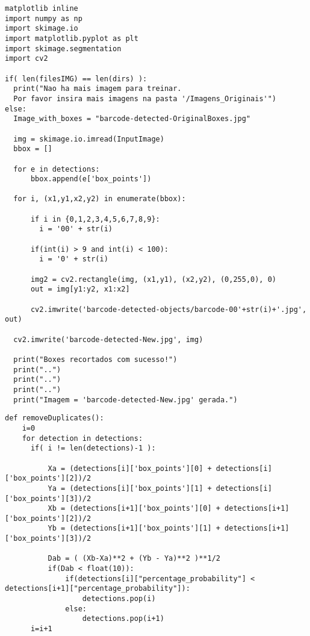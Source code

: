 \begin{lstlisting}[caption=Recorte das \textit{bounding box} e exportação para uma pasta tags-images]
matplotlib inline
import numpy as np
import skimage.io
import matplotlib.pyplot as plt
import skimage.segmentation
import cv2

if( len(filesIMG) == len(dirs) ):
  print("Nao ha mais imagem para treinar. 
  Por favor insira mais imagens na pasta '/Imagens_Originais'")
else:
  Image_with_boxes = "barcode-detected-OriginalBoxes.jpg"

  img = skimage.io.imread(InputImage)
  bbox = []

  for e in detections:
      bbox.append(e['box_points'])

  for i, (x1,y1,x2,y2) in enumerate(bbox):

      if i in {0,1,2,3,4,5,6,7,8,9}:
        i = '00' + str(i)
      
      if(int(i) > 9 and int(i) < 100):
        i = '0' + str(i)

      img2 = cv2.rectangle(img, (x1,y1), (x2,y2), (0,255,0), 0)
      out = img[y1:y2, x1:x2]

      cv2.imwrite('barcode-detected-objects/barcode-00'+str(i)+'.jpg', out)

  cv2.imwrite('barcode-detected-New.jpg', img)

  print("Boxes recortados com sucesso!")
  print("..")
  print("..")
  print("..")
  print("Imagem = 'barcode-detected-New.jpg' gerada.")
\end{lstlisting}

\newpage
\begin{lstlisting}[caption=Função para fazer a diferença entre distância dos números para deletar o de menor Acurácia, label=ap:removeNumber]
def removeDuplicates():
    i=0
    for detection in detections:
      if( i != len(detections)-1 ):
          
          Xa = (detections[i]['box_points'][0] + detections[i]['box_points'][2])/2
          Ya = (detections[i]['box_points'][1] + detections[i]['box_points'][3])/2
          Xb = (detections[i+1]['box_points'][0] + detections[i+1]['box_points'][2])/2
          Yb = (detections[i+1]['box_points'][1] + detections[i+1]['box_points'][3])/2

          Dab = ( (Xb-Xa)**2 + (Yb - Ya)**2 )**1/2
          if(Dab < float(10)):
              if(detections[i]["percentage_probability"] < detections[i+1]["percentage_probability"]):
                  detections.pop(i)
              else:
                  detections.pop(i+1)
      i=i+1
\end{lstlisting}

